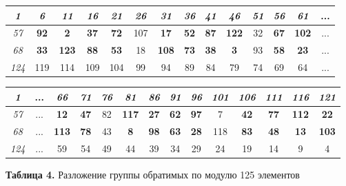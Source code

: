 \begin{center}
    \begin{tabular}{| c | c | c | c | c | c | c | c | c | c | c | c | c | c }
    \hline
    \itshape{1} & \itshape{6} & \itshape{11} & \itshape{16} & \itshape{21} & \itshape{26} & \itshape{31} & \itshape{36} & \itshape{41} & \itshape{46} & \itshape{51} & \itshape{56} & \itshape{61} & ... \\ \hline
    \itshape{57} & \textbf{92} & \textbf{2} & \textbf{37} & \textbf{72} & 107 & \textbf{17} & \textbf{52} & \textbf{87} & \textbf{122} & 32 & \textbf{67} & \textbf{102} & ...
\\ \hline
    \itshape{68} & \textbf{33} & \textbf{123} & \textbf{88} & \textbf{53} & 18 & \textbf{108} & \textbf{73} & \textbf{38} & \textbf{3} & 93 & \textbf{58} & \textbf{23} & ...
\\ \hline
    \itshape{124} & 119 & 114 & 109 & 104 & 99 & 94 & 89 & 84 & 79 & 74 & 69 & 64 & ...
\\ \hline
    \end{tabular}
\end{center}

\begin{center}
    \begin{tabular}{| c | c  c | c | c | c | c | c | c | c | c | c | c | c }
    \hline
    \itshape{1} & ... & \itshape{66} & \itshape{71} & \itshape{76} & \itshape{81} & \itshape{86} & \itshape{91} & \itshape{96} & \itshape{101} & \itshape{106} & \itshape{111} & \itshape{116} & \itshape{121} \\ \hline
    \itshape{57} & ... & \textbf{12} & \textbf{47} & 82 & \textbf{117} & \textbf{27} & \textbf{62} & \textbf{97} & 7 & \textbf{42} & \textbf{77} & \textbf{112} & \textbf{22}
\\ \hline
    \itshape{68} & ... & \textbf{113} & \textbf{78} & 43 & \textbf{8} & \textbf{98} & \textbf{63} & \textbf{28} & 118 & \textbf{83} & \textbf{48} & \textbf{13} & \textbf{103}
\\ \hline
    \itshape{124} & ... & 59 & 54 & 49 & 44 & 39 & 34 & 29 & 24 & 19 & 14 & 9 & 4
\\ \hline
    \end{tabular}
\end{center}

\noindent \textbf{Таблица 4.} Разложение группы обратимых по модулю 125 элементов \par

\vspace{\baselineskip}

